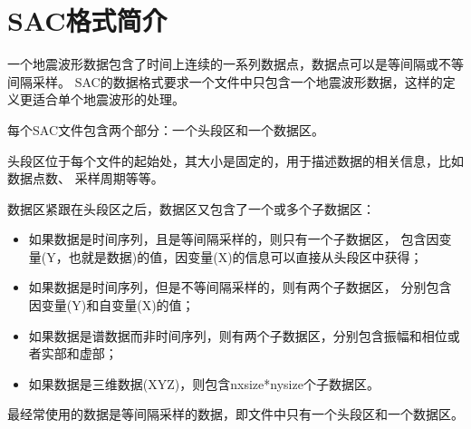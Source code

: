 \section{SAC格式简介}
一个地震波形数据包含了时间上连续的一系列数据点，数据点可以是等间隔或不等间隔采样。
SAC的数据格式要求一个文件中只包含一个地震波形数据，这样的定义更适合单个地震波形的处理。

每个SAC文件包含两个部分：一个头段区和一个数据区。

头段区位于每个文件的起始处，其大小是固定的，用于描述数据的相关信息，比如数据点数、
采样周期等等。

数据区紧跟在头段区之后，数据区又包含了一个或多个子数据区：
\begin{itemize}
\item 如果数据是时间序列，且是等间隔采样的，则只有一个子数据区，
    包含因变量(Y，也就是数据)的值，因变量(X)的信息可以直接从头段区中获得；
\item 如果数据是时间序列，但是不等间隔采样的，则有两个子数据区，
    分别包含因变量(Y)和自变量(X)的值；
\item 如果数据是谱数据而非时间序列，则有两个子数据区，分别包含振幅和相位或者实部和虚部；
\item 如果数据是三维数据(XYZ)，则包含nxsize*nysize个子数据区。
\end{itemize}
最经常使用的数据是等间隔采样的数据，即文件中只有一个头段区和一个数据区。

